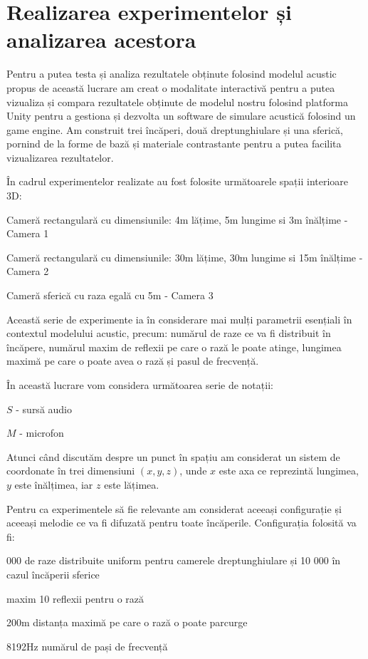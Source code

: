 \section{Realizarea experimentelor și analizarea acestora}

	Pentru a putea testa și analiza rezultatele obținute folosind modelul acustic propus de această lucrare am creat o modalitate interactivă pentru a putea vizualiza și compara rezultatele obținute de modelul nostru folosind platforma Unity pentru a gestiona și dezvolta un software de simulare acustică folosind un game engine. Am construit trei încăperi, două dreptunghiulare și una sferică, pornind de la forme de bază și materiale contrastante pentru a putea facilita vizualizarea rezultatelor. 
	
	În cadrul experimentelor realizate au fost folosite următoarele spații interioare 3D:
	
	\begin{itemize}
		\utb Cameră rectangulară cu dimensiunile: 4m lățime, 5m lungime si 3m înălțime - Camera 1 
		
		\utb Cameră rectangulară cu dimensiunile: 30m lățime, 30m lungime si 15m înălțime - Camera 2 
		
		\utb Cameră sferică cu raza egală cu 5m - Camera 3 
	\end{itemize}

	Această serie de experimente ia în considerare mai mulți parametrii esențiali în contextul modelului acustic, precum: numărul de raze ce va fi distribuit în încăpere, numărul maxim de reflexii pe care o rază le poate atinge, lungimea maximă pe care o poate avea o rază și pasul de frecvență.	
	
	În această lucrare vom considera următoarea serie de notații:
	\begin{itemize}
		\utb $S$ - sursă audio
		
		\utb $M$ - microfon 
	\end{itemize}

	Atunci când discutăm despre un punct în spațiu am considerat un sistem de coordonate în trei dimensiuni $(x,y,z)$, unde $x$ este axa ce reprezintă lungimea, $y$ este înălțimea, iar $z$ este lățimea.
	
	Pentru ca experimentele să fie relevante am considerat aceeași configurație și aceeași melodie ce va fi difuzată pentru toate încăperile. Configurația folosită va fi:
	
	\begin{itemize}
		 000 de raze distribuite uniform pentru camerele dreptunghiulare și 10 000 în cazul încăperii sferice
		
		\utb maxim 10 reflexii pentru o rază
		
		\utb 200m distanța maximă pe care o rază o poate parcurge
		
		\utb 8192Hz numărul de pași de frecvență
	\end{itemize}

